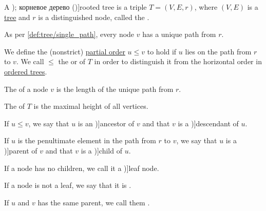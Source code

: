 \begin{definition}\label{def:rooted_tree}
  A \term[ru=ориентированное дерево (\cite[323]{ЕмеличевИПр1990ТеорияГрафов}); корневое дерево (\cite[\S 9.2.1]{Новиков2013ДискретнаяМатематика})]{rooted tree} is a triple \( T = (V, E, r) \), where \( (V, E) \) is a \hyperref[def:tree]{tree} and \( r \) is a distinguished node, called the .

  As per \cref{def:tree/single_path}, every node \( v \) has a unique path from \( r \).

  \begin{thmenum}
     We define the (nonstrict) \hyperref[def:partially_ordered_set]{partial order} \( u \leq v \) to hold if \( u \) lies on the path from \( r \) to \( v \). We call \( \leq \) the  or  of \( T \) in order to distinguish it from the horizontal order in \hyperref[def:ordered_tree]{ordered trees}.

     The  of a node \( v \) is the length of the unique path from \( r \).

     The  of \( T \) is the maximal height of all vertices.

     If \( u \leq v \), we say that \( u \) is an \term[ru=предок (\cite[298]{БелоусовТкачёв2004ДискретнаяМатематика})]{ancestor} of \( v \) and that \( v \) is a \term[ru=потомок (\cite[298]{БелоусовТкачёв2004ДискретнаяМатематика})]{descendant} of \( u \).

     If \( u \) is the penultimate element in the path from \( r \) to \( v \), we say that \( u \) is a \term[ru=отец (\cite[298]{БелоусовТкачёв2004ДискретнаяМатематика})]{parent} of \( v \) and that \( v \) is a \term[ru=сын (\cite[298]{БелоусовТкачёв2004ДискретнаяМатематика})]{child} of \( u \).

     If a node has no children, we call it a \term[ru=лист (\cite[298]{БелоусовТкачёв2004ДискретнаяМатематика})]{leaf node}.

     If a node is not a leaf, we say that it is .

     If \( u \) and \( v \) has the same parent, we call them .
  \end{thmenum}


\end{definition}
